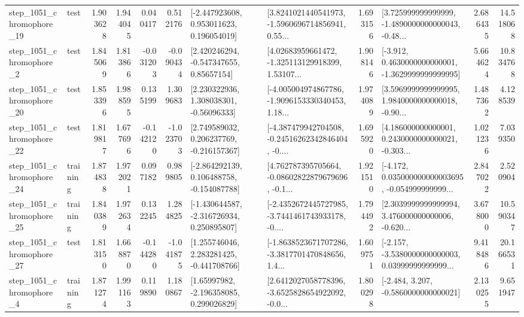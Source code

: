 \begin{tabular}{llrrrrllrlrr}
 step\_1051\_chromophore\_19 &      test &      1.903628 &    1.944045 &      0.040417 &  0.512176 &    [-2.447923608, 0.953011623, 0.196054019] &  [3.8241021440541973, -1.5960696714856941, 0.55... &       1.693156 &  [3.725999999999999, -1.4890000000000043, -0.48... &            2.686435 &         14.518068 \\
  step\_1051\_chromophore\_2 &      test &      1.845069 &    1.813866 &     -0.031203 & -0.090434 &     [2.420246294, -0.547347655, 0.85657154] &  [4.02683959661472, -1.325113129918399, 1.53107... &       1.908146 &  [-3.912, 0.4630000000000001, -1.3629999999999995] &            5.664624 &         10.834768 \\
 step\_1051\_chromophore\_20 &      test &      1.853396 &    1.988595 &      0.135199 &  1.309683 &     [2.230322936, 1.308038301, -0.56096333] &  [-4.005004974867786, -1.9096153330340453, 1.18... &       1.974089 &  [3.5969999999999995, 1.9840000000000018, -0.90... &            1.487362 &          4.128539 \\
 step\_1051\_chromophore\_22 &      test &      1.819817 &    1.677696 &     -0.142120 & -1.023703 &    [2.749589032, 0.206237769, -0.216157367] &  [-4.387479942704508, -0.24516262342846404, -0.... &       1.695920 &  [4.186000000000001, 0.2430000000000021, -0.303... &            1.021236 &          7.039350 \\
 step\_1051\_chromophore\_24 &  training &      1.874838 &    1.972021 &      0.097182 &  0.989805 &   [-2.864292139, 0.106488758, -0.154087788] &  [4.762787395705664, -0.08602822879679696, -0.1... &       1.921510 &  [-4.172, 0.035000000000003695, -0.054999999999... &            2.847022 &          2.520904 \\
 step\_1051\_chromophore\_25 &  training &      1.840389 &    1.972634 &      0.132245 &  1.284825 &   [-1.430644587, -2.316726934, 0.250895807] &  [-2.4352672445727985, -3.7441461743933178, -0.... &       1.794492 &  [2.3039999999999994, 3.476000000000006, -0.620... &            3.678000 &         10.590347 \\
 step\_1051\_chromophore\_27 &      test &      1.813150 &    1.668870 &     -0.144280 & -1.041875 &    [1.255746046, 2.283281425, -0.441708766] &  [-1.8638523671707286, -3.3817701470848656, 1.4... &       1.609751 &  [-2.157, -3.5380000000000003, 0.03999999999999... &            9.418486 &         20.166531 \\
  step\_1051\_chromophore\_4 &  training &      1.871274 &    1.991163 &      0.119890 &  1.180867 &     [1.65997982, -2.196358085, 0.299026829] &  [2.6412027058778396, -3.6525828654922092, -0.0... &       1.800298 &               [-2.484, 3.207, -0.5860000000000021] &            2.130255 &          9.651947 \\

\end{tabular}

